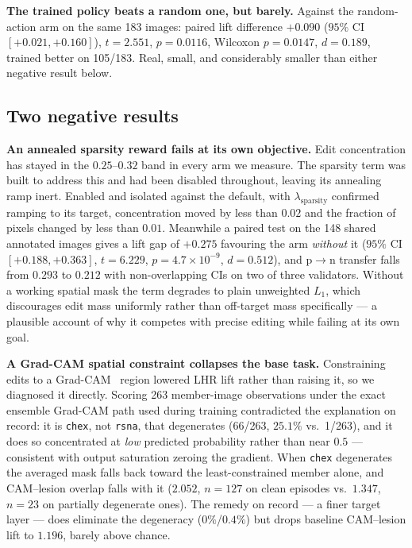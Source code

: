 \documentclass[10pt,twocolumn,letterpaper]{article}
\begin{document}
\textbf{The trained policy beats a random one, but barely.} Against the
random-action arm on the same 183 images: paired lift difference
$+0.090$ ($95\%$ CI $[+0.021,+0.160]$), $t=2.551$, $p=0.0116$, Wilcoxon
$p=0.0147$, $d=0.189$, trained better on 105/183. Real, small, and
considerably smaller than either negative result below.

\subsection{Two negative results}
\label{sec:negresults}

\textbf{An annealed sparsity reward fails at its own objective.} Edit
concentration has stayed in the $0.25$--$0.32$ band in every arm we
measure. The sparsity term was built to address this and had been
disabled throughout, leaving its annealing ramp inert. Enabled and
isolated against the default, with $\lambda_{\text{sparsity}}$ confirmed
ramping to its target, concentration moved by less than $0.02$ and the
fraction of pixels changed by less than $0.01$. Meanwhile a paired test
on the 148 shared annotated images gives a lift gap of $+0.275$
favouring the arm \emph{without} it ($95\%$ CI $[+0.188,+0.363]$,
$t=6.229$, $p=4.7\times10^{-9}$, $d=0.512$), and p$\to$n transfer falls
from $0.293$ to $0.212$ with non-overlapping CIs on two of three
validators. Without a working spatial mask the term degrades to plain
unweighted $L_1$, which discourages edit mass uniformly rather than
off-target mass specifically --- a plausible account of why it competes
with precise editing while failing at its own goal.

\textbf{A Grad-CAM spatial constraint collapses the base task.}
Constraining edits to a Grad-CAM~\cite{selvaraju2017gradcam} region
lowered LHR lift rather than raising it, so we diagnosed it directly.
Scoring 263 member-image observations under the exact ensemble Grad-CAM
path used during training contradicted the explanation on record: it is
\texttt{chex}, not \texttt{rsna}, that degenerates (66/263, $25.1\%$ vs.\
1/263), and it does so concentrated at \emph{low} predicted probability
rather than near $0.5$ --- consistent with output saturation zeroing the
gradient. When \texttt{chex} degenerates the averaged mask falls back
toward the least-constrained member alone, and CAM--lesion overlap falls
with it ($2.052$, $n=127$ on clean episodes vs.\ $1.347$, $n=23$ on
partially degenerate ones). The remedy on record --- a finer target layer
--- does eliminate the degeneracy ($0\%$/$0.4\%$) but drops baseline
CAM--lesion lift to $1.196$, barely above chance.
\end{document}
